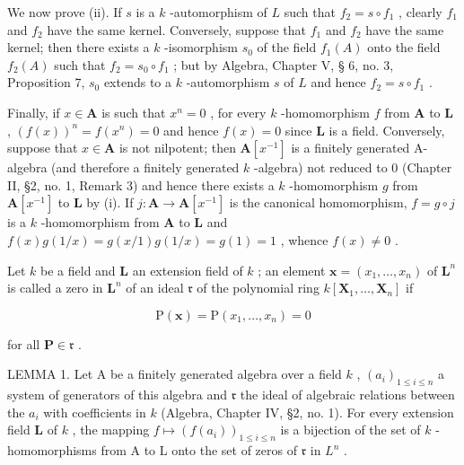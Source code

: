 We now prove (ii). If \(s\) is a \(k\) -automorphism of \(L\) such that \(f_2 = s \circ f_1\) , clearly \(f_1\) and \(f_2\) have the same kernel. Conversely, suppose that \(f_1\) and \(f_2\) have the same kernel; then there exists a \(k\) -isomorphism \(s_0\) of the field \(f_1(A)\) onto the field \(f_2(A)\) such that \(f_2 = s_0 \circ f_1\) ; but by Algebra, Chapter V, § 6, no. 3, Proposition 7, \(s_0\) extends to a \(k\) -automorphism \(s\) of \(L\) and hence \(f_2 = s \circ f_1\) .

Finally, if \(x \in \mathbf{A}\) is such that \(x^n = 0\) , for every \(k\) -homomorphism \(f\) from \(\mathbf{A}\) to \(\mathbf{L}\) , \((f(x))^n = f(x^n) = 0\) and hence \(f(x) = 0\) since \(\mathbf{L}\) is a field. Conversely, suppose that \(x \in \mathbf{A}\) is not nilpotent; then \(\mathbf{A}[x^{-1}]\) is a finitely generated A-algebra (and therefore a finitely generated \(k\) -algebra) not reduced to 0 (Chapter II, §2, no. 1, Remark 3) and hence there exists a \(k\) -homomorphism \(g\) from \(\mathbf{A}[x^{-1}]\) to \(\mathbf{L}\) by (i). If \(j: \mathbf{A} \to \mathbf{A}[x^{-1}]\) is the canonical homomorphism, \(f = g \circ j\) is a \(k\) -homomorphism from \(\mathbf{A}\) to \(\mathbf{L}\) and \(f(x)g(1/x) = g(x/1)g(1/x) = g(1) = 1\) , whence \(f(x) \neq 0\) .

Let \(k\) be a field and \(\mathbf{L}\) an extension field of \(k\) ; an element \(\mathbf{x} = (x_1, \ldots, x_n)\) of \(\mathbf{L}^n\) is called a zero in \(\mathbf{L}^n\) of an ideal \(\mathfrak{r}\) of the polynomial ring \(k[\mathbf{X}_1, \ldots, \mathbf{X}_n]\) if

\[
\mathrm{P} (\mathbf {x}) = \mathrm{P} (x _ {1}, \dots , x _ {n}) = 0
\]

for all \(\mathbf{P} \in \mathfrak{r}\) .

LEMMA 1. Let A be a finitely generated algebra over a field \(k\) , \((a_i)_{1 \leqslant i \leqslant n}\) a system of generators of this algebra and \(\mathfrak{r}\) the ideal of algebraic relations between the \(a_i\) with coefficients in \(k\) (Algebra, Chapter IV, §2, no. 1). For every extension field \(\mathbf{L}\) of \(k\) , the mapping \(f \mapsto (f(a_i))_{1 \leqslant i \leqslant n}\) is a bijection of the set of \(k\) -homomorphisms from A to L onto the set of zeros of \(\mathfrak{r}\) in \(L^n\) .

